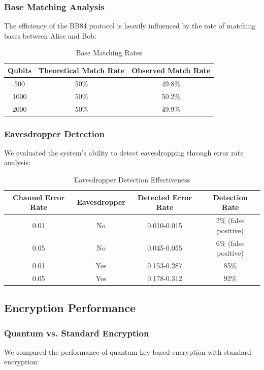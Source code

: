 \documentclass[conference]{IEEEtran}
\begin{document}
\subsubsection{Base Matching Analysis}
The efficiency of the BB84 protocol is heavily influenced by the rate of matching bases between Alice and Bob:

\begin{table}[h]
\centering
\begin{tabular}{|c|c|c|}
\hline
\textbf{Qubits} & \textbf{Theoretical Match Rate} & \textbf{Observed Match Rate} \\
\hline
500 & 50\% & 49.8\% \\
\hline
1000 & 50\% & 50.2\% \\
\hline
2000 & 50\% & 49.9\% \\
\hline
\end{tabular}
\caption{Base Matching Rates}
\label{tab:base_matching}
\end{table}

\subsubsection{Eavesdropper Detection}
We evaluated the system's ability to detect eavesdropping through error rate analysis:

\begin{table}[h]
\centering
\begin{tabular}{|c|c|c|c|}
\hline
\textbf{Channel Error Rate} & \textbf{Eavesdropper} & \textbf{Detected Error Rate} & \textbf{Detection Rate} \\
\hline
0.01 & No & 0.010-0.015 & 2\% (false positive) \\
\hline
0.05 & No & 0.045-0.055 & 6\% (false positive) \\
\hline
0.01 & Yes & 0.153-0.287 & 85\% \\
\hline
0.05 & Yes & 0.178-0.312 & 92\% \\
\hline
\end{tabular}
\caption{Eavesdropper Detection Effectiveness}
\label{tab:eavesdropper_detection}
\end{table}

\subsection{Encryption Performance}

\subsubsection{Quantum vs. Standard Encryption}
We compared the performance of quantum-key-based encryption with standard encryption:
\end{document}
